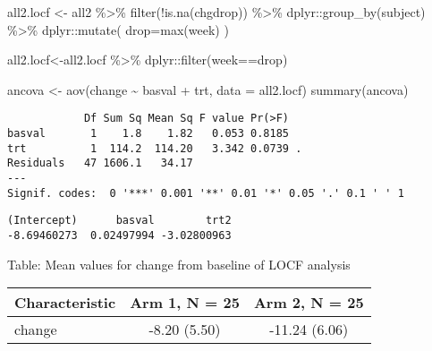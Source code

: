 \documentclass[
  letterpaper,
  DIV=11,
  numbers=noendperiod]{scrreprt}
\newenvironment{Shaded}{\begin{snugshade}}{\end{snugshade}}
\newcommand{\AttributeTok}[1]{\textcolor[rgb]{0.40,0.45,0.13}{#1}}
\newcommand{\FunctionTok}[1]{\textcolor[rgb]{0.28,0.35,0.67}{#1}}
\newcommand{\NormalTok}[1]{\textcolor[rgb]{0.00,0.23,0.31}{#1}}
\newcommand{\OtherTok}[1]{\textcolor[rgb]{0.00,0.23,0.31}{#1}}
\newcommand{\SpecialCharTok}[1]{\textcolor[rgb]{0.37,0.37,0.37}{#1}}
\begin{document}
\begin{Shaded}
\begin{Highlighting}[]
\NormalTok{all2.locf }\OtherTok{\textless{}{-}}\NormalTok{ all2 }\SpecialCharTok{\%\textgreater{}\%} \FunctionTok{filter}\NormalTok{(}\SpecialCharTok{!}\FunctionTok{is.na}\NormalTok{(chgdrop)) }\SpecialCharTok{\%\textgreater{}\%}
\NormalTok{  dplyr}\SpecialCharTok{::}\FunctionTok{group\_by}\NormalTok{(subject) }\SpecialCharTok{\%\textgreater{}\%} 
\NormalTok{  dplyr}\SpecialCharTok{::}\FunctionTok{mutate}\NormalTok{( }\AttributeTok{drop=}\FunctionTok{max}\NormalTok{(week) )}

\NormalTok{all2.locf}\OtherTok{\textless{}{-}}\NormalTok{all2.locf }\SpecialCharTok{\%\textgreater{}\%}\NormalTok{ dplyr}\SpecialCharTok{::}\FunctionTok{filter}\NormalTok{(week}\SpecialCharTok{==}\NormalTok{drop)}

\NormalTok{ancova }\OtherTok{\textless{}{-}} \FunctionTok{aov}\NormalTok{(change }\SpecialCharTok{\textasciitilde{}}\NormalTok{ basval }\SpecialCharTok{+}\NormalTok{ trt, }\AttributeTok{data =}\NormalTok{ all2.locf)}
\FunctionTok{summary}\NormalTok{(ancova)}
\end{Highlighting}
\end{Shaded}

\begin{verbatim}
            Df Sum Sq Mean Sq F value Pr(>F)  
basval       1    1.8    1.82   0.053 0.8185  
trt          1  114.2  114.20   3.342 0.0739 .
Residuals   47 1606.1   34.17                 
---
Signif. codes:  0 '***' 0.001 '**' 0.01 '*' 0.05 '.' 0.1 ' ' 1
\end{verbatim}

\begin{Shaded}
\end{Shaded}

\begin{verbatim}
(Intercept)      basval        trt2 
-8.69460273  0.02497994 -3.02800963 
\end{verbatim}

Table: Mean values for change from baseline of LOCF analysis

\begin{longtable}[]{@{}lcc@{}}
\toprule\noalign{}
\textbf{Characteristic} & \textbf{Arm 1}, N = 25 & \textbf{Arm 2}, N =
25 \\
\midrule\noalign{}
\endhead
\bottomrule\noalign{}
\endlastfoot
change & -8.20 (5.50) & -11.24 (6.06) \\
\end{longtable}
\end{document}
